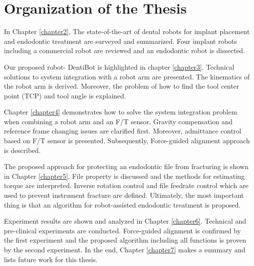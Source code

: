 \section*{Organization of the Thesis}
\hspace*{6mm}In Chapter \ref{chapter2}, The state-of-the-art of dental robots for implant placement and endodontic treatment are surveyed and summarized. Four implant robots including a commercial robot are reviewed and an endodontic robot is dissected. 
\par
Our proposed robot- DentiBot is highlighted in chapter \ref{chapter3}. Technical solutions to system integration with a robot arm are presented. The kinematics of the robot arm is derived. Moreover, the problem of how to find the tool center point (TCP) and tool angle is explained.  
\par
Chapter \ref{chapter4} demonstrates how to solve the system integration problem when combining a robot arm and an F/T sensor. Gravity compensation and reference frame changing issues are clarified first. Moreover, admittance control based on F/T sensor is presented. Subsequently, Force-guided alignment approach is described.  
\par
The proposed approach for protecting an endodontic file from fracturing is shown in Chapter \ref{chapter5}. File property is discussed and the methods for estimating torque are interpreted. Inverse rotation control and file feedrate control which are used to prevent instrument fracture are defined. Ultimately, the most important thing is that an algorithm for robot-assisted endodontic treatment is proposed.
\par
Experiment results are shown and analyzed in Chapter \ref{chapter6}. Technical and pre-clinical experiments are conducted. Force-guided alignment is confirmed by the first experiment and the proposed algorithm including all functions is proven by the second experiment.
In the end, Chapter \ref{chapter7} makes a summary and lists future work for this thesis.